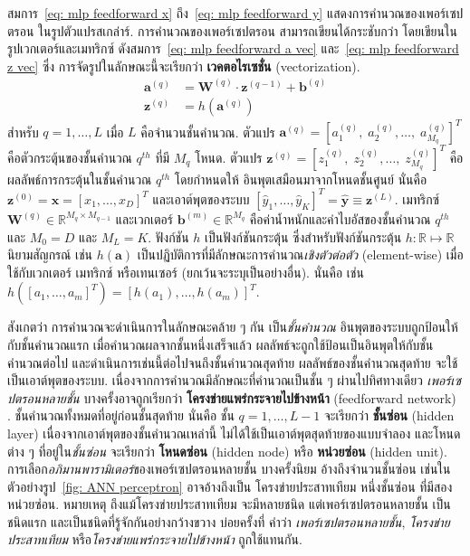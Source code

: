 สมการ~\ref{eq: mlp feedforward x} ถึง~\ref{eq: mlp feedforward y}
แสดงการคำนวณของเพอร์เซปตรอน
ในรูปตัวแปรสเกล่าร์.
การคำนวณของเพอร์เซปตรอน
สามารถเขียนได้กระชับกว่า
โดยเขียนในรูปเวกเตอร์และเมทริกซ์
ดังสมการ~\ref{eq: mlp feedforward a vec}
และ~\ref{eq: mlp feedforward z vec} 
ซึ่ง การจัดรูปในลักษณะนี้จะเรียกว่า
\textbf{เวคตอไรเซชั่น} (vectorization).
\begin{align}
\bm{a}^{(q)} &=   \bm{W}^{(q)} \cdot \bm{z}^{(q-1)} + \bm{b}^{(q)}
\label{eq: mlp feedforward a vec} \\
\bm{z}^{(q)} &= h(\bm{a}^{(q)})
\label{eq: mlp feedforward z vec}
\end{align}
สำหรับ $q = 1, \ldots, L$
เมื่อ $L$ คือจำนวนชั้นคำนวณ.
ตัวแปร $\bm{a}^{(q)} = [a^{(q)}_1, \;a^{(q)}_2, \ldots, \; a^{(q)}_{M_q}]^T$ คือตัวกระตุ้นของชั้นคำนวณ $q^{th}$
ที่มี $M_q$ โหนด.
ตัวแปร $\bm{z}^{(q)} = [z^{(q)}_1, \;z^{(q)}_2, \ldots, \; z^{(q)}_{M_q}]^T$ คือ ผลลัพธ์การกระตุ้นในชั้นคำนวณ $q^{th}$
โดยกำหนดให้
อินพุตเสมือนมาจากโหนดชั้นศูนย์ นั่นคือ
$\bm{z}^{(0)}  = \bm{x} = [x_1, \ldots, x_D]^T$
และเอาต์พุตของระบบ
$[\hat{y}_1, \ldots, \hat{y}_K]^T = \bm{\hat{y}} \equiv \bm{z}^{(L)}$.
เมทริกซ์ $\bm{W}^{(q)} \in \mathbb{R}^{M_q \times M_{q-1}}$
และเวกเตอร์ $\bm{b}^{(m)} \in \mathbb{R}^{M_q}$
คือค่าน้ำหนักและค่าไบอัสของชั้นคำนวณ $q^{th}$
และ $M_0 = D$ และ $M_L = K$.
ฟังก์ชัน $h$ เป็นฟังก์ชันกระตุ้น
ซึ่งสำหรับฟังก์ชันกระตุ้น $h: \mathbb{R} \mapsto \mathbb{R}$
นิยามสัญกรณ์ เช่น $h(\bm{a})$ เป็นปฏิบัติการที่มีลักษณะการคำนวณ\textit{เชิงตัวต่อตัว} (element-wise) เมื่อใช้กับเวกเตอร์ เมทริกซ์ หรือเทนเซอร์ (ยกเว้นจะระบุเป็นอย่างอื่น).
นั่นคือ เช่น $h([a_1, \ldots, a_m]^T) =[h(a_1), \ldots, h(a_m)]^T$.

สังเกตว่า
การคำนวณจะดำเนินการในลักษณะคล้าย ๆ กัน
เป็น\textit{ชั้นคำนวณ} 
อินพุตของระบบถูกป้อนให้กับชั้นคำนวณแรก
เมื่อคำนวณผลจากชั้นหนึ่งเสร็จแล้ว ผลลัพธ์จะถูกใช้ป้อนเป็นอินพุตให้กับชั้นคำนวณต่อไป และดำเนินการเช่นนี้ต่อไปจนถึงชั้นคำนวณสุดท้าย
ผลลัพธ์ของชั้นคำนวณสุดท้าย จะใช้เป็นเอาต์พุตของระบบ.
เนื่องจากการคำนวณมีลักษณะที่คำนวณเป็นชั้น ๆ ผ่านไปทิศทางเดียว 
\textit{เพอร์เซปตรอนหลายชั้น}
บางครั้งอาจถูกเรียกว่า \textbf{โครงข่ายแพร่กระจายไปข้างหน้า} (feedforward network)
.
ชั้นคำนวณทั้งหมดที่อยู่ก่อนชั้นสุดท้าย
นั่นคือ ชั้น $q = 1, \ldots, L-1$
จะเรียกว่า \textbf{ชั้นซ่อน} (hidden layer)
เนื่องจากเอาต์พุตของชั้นคำนวณเหล่านี้
ไม่ได้ใช้เป็นเอาต์พุตสุดท้ายของแบบจำลอง
และโหนดต่าง ๆ ที่อยู่ใน\textit{ชั้นซ่อน} จะเรียกว่า \textbf{โหนดซ่อน} (hidden node) หรือ \textbf{หน่วยซ่อน} (hidden unit).
การเลือก\textit{อภิมานพารามิเตอร์}ของเพอร์เซปตรอนหลายชั้น
บางครั้งนิยม อ้างถึงจำนวนชั้นซ่อน เช่นในตัวอย่างรูป~\ref{fig: ANN perceptron} อาจอ้างถึงเป็น
โครงข่ายประสาทเทียม หนึ่งชั้นซ่อน ที่มีสองหน่วยซ่อน.
หมายเหตุ ถึงแม้โครงข่ายประสาทเทียม
จะมีหลายชนิด
แต่เพอร์เซปตรอนหลายชั้น เป็นชนิดแรก และเป็นชนิดที่รู้จักกันอย่างกว้างขวาง
บ่อยครั้งที่ 
คำว่า 
\textit{เพอร์เซปตรอนหลายชั้น},
\textit{โครงข่ายประสาทเทียม}
หรือ\textit{โครงข่ายแพร่กระจายไปข้างหน้า} ถูกใช้แทนกัน.

